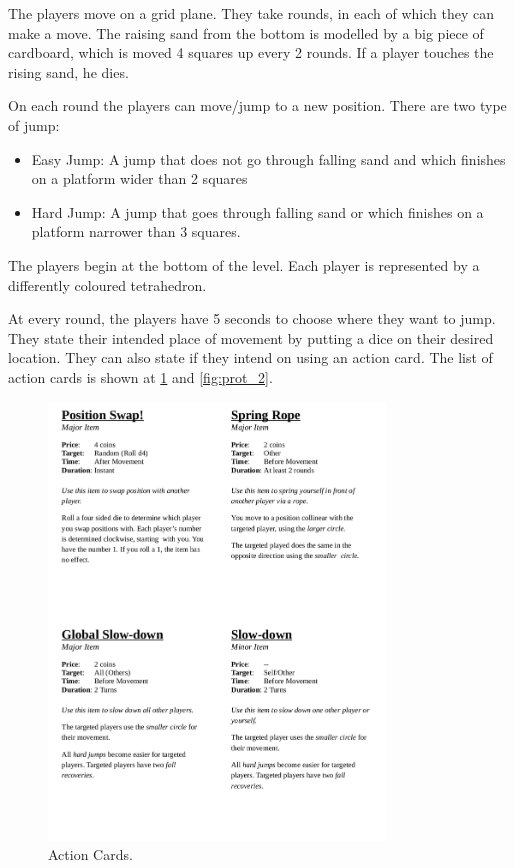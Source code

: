 The players move on a grid plane. They take rounds, in each of which they can make a move. The raising sand from the bottom is modelled by a big piece of cardboard, which is moved 4 squares up every 2 rounds. If a player touches the rising sand, he dies.

On each round the players can move/jump to a new position.
There are two type of jump:
\begin{itemize}
    \item Easy Jump: A jump that does not go through falling sand and which finishes on a platform wider than 2 squares
    \item Hard Jump: A jump that goes through falling sand or which finishes on a platform narrower than 3 squares.
\end{itemize}

The players begin at the bottom of the level. Each player is represented by a differently coloured tetrahedron.

At every round, the players have 5 seconds to choose where they want to jump. They state their intended place of movement by putting a dice on their desired location. They can also state if they intend on using an action card. The list of action cards is shown at \ref{fig:prot_1} and \ref{fig:prot_2}.



\begin{figure}
    \centering
    \includegraphics[width=0.8\textwidth]{figures/Prototype/topmeifyoucan_1.png}
    \caption{Action Cards.}
    \label{fig:prot_1}
\end{figure}



